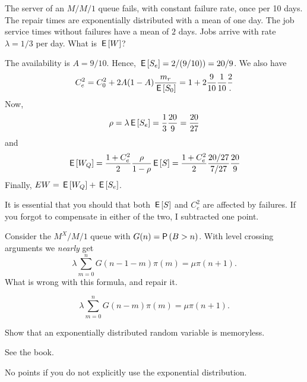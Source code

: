 \begin{exercise}[201704]
  The server of an $M/M/1$ queue fails, with constant failure rate, once per 10 days.
  The repair times are exponentially distributed with a mean of one day.
  The job service times without failures have a mean of $2$ days.
  Jobs arrive with rate $\lambda=1/3$ per day.
  What is $\,\mathsf{E}\left[W\right]$?
\begin{solution}
  The availability is $A=9/10$. Hence, $\,\mathsf{E}\left[S_e\right] = 2/(9/10)) = 20/9$. We also have
\begin{equation*}
   C_e^2 = C_0^2 + 2A(1-A)\frac{m_r}{\,\mathsf{E}\left[S_0\right]} = 1 + 2\frac{9}{10}\frac1{10}\frac{2}.
 \end{equation*}
Now,
\begin{equation*}
  \rho = \lambda \,\mathsf{E}\left[S_e\right] = \frac13 \frac{20}9 = \frac{20}{27}
\end{equation*}
and
\begin{equation*}
  \,\mathsf{E}\left[W_Q\right] = \frac{1 + C_e^2}2 \frac{\rho}{1-\rho} \,\mathsf{E}\left[S\right] = \frac{1 + C_e^2}2 \frac{20/27}{7/27} \frac{20}9
\end{equation*}
Finally, $E W = \,\mathsf{E}\left[W_Q\right] + \,\mathsf{E}\left[S_e\right]$.

It is essential that you should that both $\,\mathsf{E}\left[S\right]$ and $C_e^2$ are affected by failures. If you forgot to compensate in either of the two, I subtracted one point. 
\end{solution}
\end{exercise}

\begin{exercise}[201704]%
  Consider the $M^X/M/1$ queue with $G(n) = \P{B>n}$.
  With level crossing arguments we \emph{nearly} get
\begin{equation*}
\lambda  \sum_{m=0}^n G(n-1-m) \pi(m) = \mu \pi(n+1).
\end{equation*}
What is wrong with this formula, and repair it.
\begin{solution}
\begin{equation*}
\lambda  \sum_{m=0}^n G(n-m) \pi(m) = \mu \pi(n+1).
\end{equation*}
\end{solution}
\end{exercise}


\begin{exercise}[201706]
 Show that an  exponentially distributed random variable is memoryless.
\begin{solution}
  See the book.

No points if you do not explicitly use the exponential distribution.
\end{solution}
\end{exercise}


